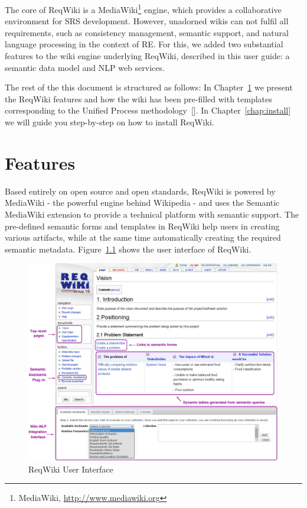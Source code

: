 \documentclass[10pt,twoside,openany,bibtotoc,liststotoc]{scrbook}
\newcommand{\blankline}{\vspace{5mm}}
\begin{document}
\blankline
The core of ReqWiki is a MediaWiki\footnote{MediaWiki, \url{http://www.mediawiki.org}} engine, which provides a collaborative environment for SRS development. However, unadorned wikis can not fulfil all requirements, such as consistency management, semantic support, and natural language processing in the context of RE. For this, we added two substantial features to the wiki engine underlying ReqWiki, described in this user guide: a semantic data model and NLP web services.

\blankline
The rest of the this document is structured as follows: In Chapter~\ref{chap:feats} we present the ReqWiki features and how the wiki has been pre-filled with templates corresponding to the Unified Process methodology~[\cite{up}]. In Chapter~\ref{chap:install} we will guide you step-by-step on how to install ReqWiki. %

\chapter{Features}
\label{chap:feats}
Based entirely on open source and open standards, ReqWiki is powered by MediaWiki - the powerful engine behind Wikipedia - and uses the Semantic MediaWiki extension to provide a technical platform with semantic support. The pre-defined semantic forms and templates in ReqWiki help users in creating various artifacts, while at the same time automatically creating the required semantic metadata. Figure~\ref{fig:reqwiki_ui} shows the user interface of ReqWiki.

\begin{figure}[h!]
  \centering
  \includegraphics[width=\textwidth]{reqwiki}
  \caption{ReqWiki User Interface}
  \label{fig:reqwiki_ui}
\end{figure}
\end{document}
